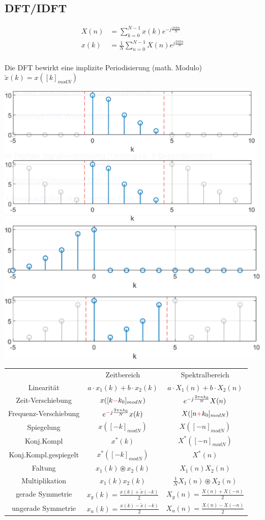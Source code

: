 \documentclass[10pt,a4paper]{article}
\begin{document}
  \subsection{DFT/IDFT}
  \begin{mdframed}[style=exercise]
    \begin{align}
        X(n)&=\sum_{k=0}^{N-1} x(k)e^{-j\frac{2\pi kn}{N}} \\
        x(k)&=\frac{1}{N}\sum_{n=0}^{N-1} X(n)e^{j\frac{2\pi kn}{N}} \\
    \end{align}
  \end{mdframed}
Die DFT bewirkt eine implizite Periodisierung (math. Modulo)
$\tilde{x}(k) = x([k]_{modN})$
  \begin{center}
      \includegraphics[width=.2\textwidth]{./img/x_k.png}
      \includegraphics[width=.2\textwidth]{./img/x_mk.png}
  \end{center}
\scriptsize
\begin{center}
\begin{tabular}{ | c | c | c | }
\cline{1-3}
        & Zeitbereich & Spektralbereich \\
\cline{1-3}
        Linearität & $a\cdot x_1(k)+ b\cdot x_2(k)$ & $a\cdot X_1(n) +b\cdot X_2(n)$ \\
\cline{1-3}
        Zeit-Verschiebung & $x([k\textcolor{red}{-}k_0]_{modN})$ & $e^{\textcolor{red}{-}j\frac{2\pi nk_0}{N}} X(n)$\\
\cline{1-3}
        Frequenz-Verschiebung & $e^{\textcolor{red}{-}j\frac{2\pi nk_0}{N}} x(k)$ & $X([n\textcolor{red}{+}k_0]_{modN})$ \\  
\cline{1-3}
        Spiegelung & $x([-k]_{modN})$ & $X([-n]_{modN})$ \\  
\cline{1-3}
        Konj.Kompl & $x^*(k)$& $X^*([-n]_{modN})$\\ 
\cline{1-3}
        Konj.Kompl.gespiegelt & $x^*([-k]_{modN})$& $X^*(n)$\\ 
\cline{1-3}
        Faltung & $x_1(k) \circledast x_2(k)$ & $X_1(n)X_2(n)$ \\  
\cline{1-3}
        Multiplikation & $x_1(k)x_2(k)$ & $\frac{1}{N} X_1(n) \circledast X_2(n)$ \\
\cline{1-3}
        gerade Symmetrie & $x_g(k)=\frac{x(k)+\tilde{x}(-k)}{2}$ & $X_g(n)=\frac{X(n)+X(-n)}{2}$ \\
\cline{1-3}
        ungerade Symmetrie & $x_u(k)=\frac{x(k)-\tilde{x}(-k)}{2}$ & $X_u(n)=\frac{X(n)-X(-n)}{2}$ \\
\cline{1-3}
\end{tabular}
\end{center}
\end{document}
